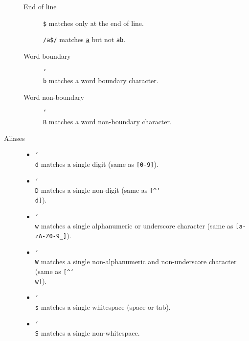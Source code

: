 \begin{description}
\begin{description}
            \item[End of line] 
                \texttt{\$} matches only at the end of line.

                \begin{example}
                    \texttt{/a\$/} matches \texttt{\underline{a}} but not \texttt{ab}.
                \end{example}

            \item[Word boundary]
                \texttt{\char`\\ b} matches a word boundary character.

            \item[Word non-boundary] 
                \texttt{\char`\\ B} matches a word non-boundary character.
        \end{description}

    \item[Aliases] \phantom{}
        \begin{itemize}
            \item \texttt{\char`\\ d} matches a single digit (same as \texttt{[0-9]}).
            
            \item \texttt{\char`\\ D} matches a single non-digit (same as \texttt{[\textasciicircum\char`\\ d]}).
            
            \item \texttt{\char`\\ w} matches a single alphanumeric or underscore character (same as \texttt{[a-zA-Z0-9\_]}).
            
            \item \texttt{\char`\\ W} matches a single non-alphanumeric and non-underscore character (same as \texttt{[\textasciicircum\char`\\ w]}).

            \item \texttt{\char`\\ s} matches a single whitespace (space or tab).
            
            \item \texttt{\char`\\ S} matches a single non-whitespace.
        \end{itemize}



\end{description}
